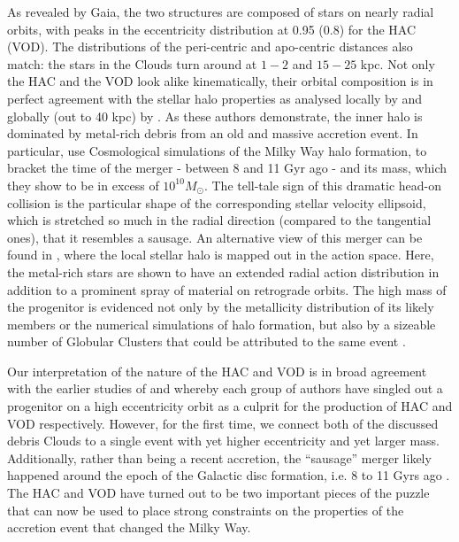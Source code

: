 \documentclass[fleqn,usenatbib]{mnras}
\begin{document}
As revealed by Gaia, the two structures are composed of stars on
nearly radial orbits, with peaks in the eccentricity distribution at
0.95 (0.8) for the HAC (VOD). The distributions of the peri-centric
and apo-centric distances also match: the stars in the Clouds turn
around at $1-2$ and $15-25$ kpc. Not only the HAC and the VOD look
alike kinematically, their orbital composition is in perfect agreement
with the stellar halo properties as analysed locally by
\citet{Belokurov2018} and globally (out to 40 kpc) by
\citet{Deason2018pileup}. As these authors demonstrate, the inner halo
is dominated by metal-rich debris from an old and massive accretion
event. In particular, \citet{Belokurov2018} use Cosmological
simulations of the Milky Way halo formation, to bracket the time of
the merger - between 8 and 11 Gyr ago - and its mass, which they show
to be in excess of $10^{10} M_{\odot}$. The tell-tale sign of this
dramatic head-on collision is the particular shape of the
corresponding stellar velocity ellipsoid, which is stretched so much
in the radial direction (compared to the tangential ones), that it
resembles a sausage. An alternative view of this merger can be found
in \citet{actionhalo}, where the local stellar halo is mapped out in
the action space. Here, the metal-rich stars are shown to have an
extended radial action distribution in addition to a prominent spray
of material on retrograde orbits. The high mass of the progenitor is
evidenced not only by the metallicity distribution of its likely
members or the numerical simulations of halo formation, but also by a
sizeable number of Globular Clusters that could be attributed to the
same event \citep[see][]{sausagegc,Kruijssen2018}.

Our interpretation of the nature of the HAC and VOD is in broad
agreement with the earlier studies of \citet{Jo2012} and \citet{Ca12}
whereby each group of authors have singled out a progenitor on a high
eccentricity orbit as a culprit for the production of HAC and VOD
respectively. However, for the first time, we connect both of the
discussed debris Clouds to a single event with yet higher eccentricity
and yet larger mass. Additionally, rather than being a recent
accretion, the ``sausage'' merger likely happened around the epoch of
the Galactic disc formation, i.e. 8 to 11 Gyrs ago
\citep[see][]{Belokurov2018}. The HAC and VOD have turned out to be
two important pieces of the puzzle that can now be used to place
strong constraints on the properties of the accretion event that
changed the Milky Way.
\end{document}

